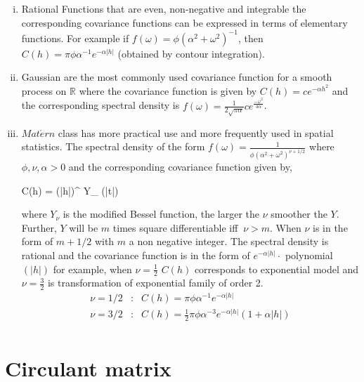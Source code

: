 \begin{enumerate}[(i)]
	\item Rational Functions that are even,  non-negative and integrable the corresponding covariance functions can be expressed in terms of elementary functions. For example if $f(\omega) =\phi (\alpha^2+\omega^2)^{-1}$, then $C(h) = \pi\phi\alpha^{-1}e^{-\alpha|h|}$ (obtained by contour integration).
	      
	\item Gaussian are the most commonly used covariance function for a smooth process on $\mathbb{R}$ where the covariance function is given by $C(h)=ce^{-\alpha h^2}$ and the corresponding spectral density is $ f(\omega) = \frac{1}{2\sqrt{\pi\alpha}}c e^{\frac{-\omega^2}{4\alpha}}$.
	      
	\item $Mat\acute{e}rn$ class has more practical use and more frequently used in spatial statistics. The spectral density of the form $f(\omega) =\frac{1}{\phi(\alpha^2+\omega^2)^{\nu+1/2}}$ where $\phi,\nu,\alpha>0$ and the corresponding covariance function given by,
	      
	      \beq
	      C(h) =  (\alpha|h|)^{\nu} Y_{\nu} (\alpha|t|)
	      \eeq
	      
	      where $Y_{\nu}$ is the modified Bessel function, the larger the $\nu$ smoother the $Y$. Further, $Y$ will be $m$ times square differentiable iff $\ \nu>m$. When $\nu$ is in the form of $m+1/2$ with $m$ a non negative integer. The spectral density is rational and the covariance function is in the form of $e^{-\alpha|h|}\cdot$ polynomial$(|h|)$ for example, when $\nu=\frac{1}{2}$ $C(h)$ corresponds to exponential model and $\nu=\frac{3}{2}$ is transformation of exponential family of order 2.     \\
	      
	      \begin{eqnarray*}
	      	\nu = 1/2 &:& C(h) = \pi\phi\alpha^{-1}e^{-\alpha|h|}\\
	      	\nu = 3/2 &:& C(h) = \frac{1}{2}\pi\phi\alpha^{-3}e^{-\alpha|h|}(1+\alpha|h|)\\
	      \end{eqnarray*}
	      
\end{enumerate}




\section{Circulant matrix}

